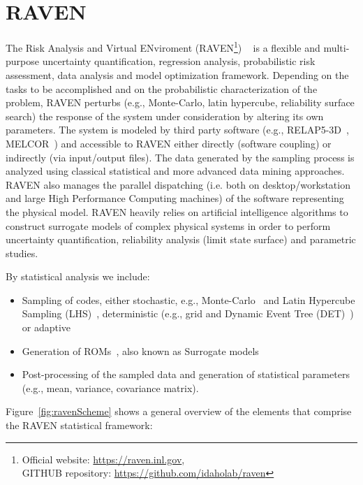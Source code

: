 \section{RAVEN}
\label{sec:raven}
 
The Risk Analysis and Virtual ENviroment 
(RAVEN\footnote{Official website: \url{https://raven.inl.gov},\\ 
GITHUB repository: \url{https://github.com/idaholab/raven}})
~\cite{RAVEN_PSAM_2014,alfonsiEsrel2014} 
is a flexible and multi-purpose uncertainty quantification, regression analysis, probabilistic
risk assessment, data analysis and model optimization framework. Depending on the tasks to be 
accomplished and on the probabilistic characterization of the problem, RAVEN perturbs 
(e.g., Monte-Carlo, latin hypercube, reliability surface search) the response of the system 
under consideration by altering its own parameters. The system is modeled by third party software 
(e.g., RELAP5-3D~\cite{relap5}, MELCOR~\cite{Melcor}) and accessible to RAVEN either directly 
(software coupling) or indirectly (via input/output files). 
The data generated by the sampling process is analyzed using 
classical statistical and more advanced data mining approaches. RAVEN also manages the parallel dispatching 
(i.e. both on desktop/workstation and large High Performance Computing machines) of the software 
representing the physical model. RAVEN heavily relies on artificial intelligence algorithms to construct 
surrogate models of complex physical systems in order to perform uncertainty quantification, reliability 
analysis (limit state surface) and parametric studies.

By statistical analysis we include:
\begin{itemize}
  \item Sampling of codes, either stochastic, e.g., Monte-Carlo~\cite{DynamicReliabilityMonteCarlo} 
        and Latin Hypercube Sampling (LHS)~\cite{LHShelton}, deterministic (e.g., grid and
        Dynamic Event Tree (DET)~\cite{AMENDOLAdylam,cojazziDylam}) or 
        adaptive~\cite{ANS_S_2014_raven_LS,mandelliSVMANS}
  \item Generation of ROMs~\cite{ROM_Khalik}, also known as Surrogate models
  \item Post-processing of the sampled data and generation of statistical parameters (e.g., mean, 
        variance, covariance matrix).
\end{itemize}

Figure~\ref{fig:ravenScheme} shows a general overview of the elements that comprise the RAVEN 
statistical framework:

